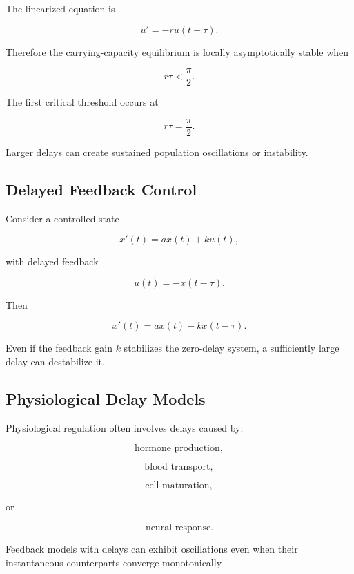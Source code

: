 The linearized equation is

\[
u'
=
-r u(t-\tau).
\]

Therefore the carrying-capacity equilibrium is locally asymptotically
stable when

\[
\boxed{
r\tau
<
\frac{\pi}{2}.
}
\]

The first critical threshold occurs at

\[
\boxed{
r\tau
=
\frac{\pi}{2}.
}
\]

Larger delays can create sustained population oscillations or instability.

\subsection{Delayed Feedback Control}
\label{subsec:delayed-feedback-control}

Consider a controlled state

\[
x'(t)
=
ax(t)
+
ku(t),
\]

with delayed feedback

\[
\boxed{
u(t)
=
-x(t-\tau).
}
\]

Then

\[
\boxed{
x'(t)
=
ax(t)
-
k x(t-\tau).
}
\]

Even if the feedback gain \(k\) stabilizes the zero-delay system, a
sufficiently large delay can destabilize it.

\subsection{Physiological Delay Models}
\label{subsec:physiological-delay-models}

Physiological regulation often involves delays caused by:

\[
\boxed{
\text{hormone production},
}
\]

\[
\boxed{
\text{blood transport},
}
\]

\[
\boxed{
\text{cell maturation},
}
\]

or

\[
\boxed{
\text{neural response}.
}
\]

Feedback models with delays can exhibit oscillations even when their
instantaneous counterparts converge monotonically.

